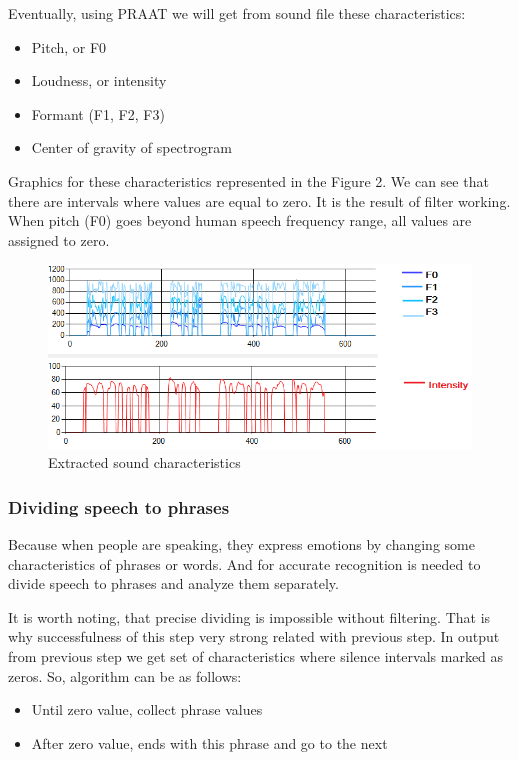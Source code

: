 \documentclass[12pt, letterpaper]{article}
\begin{document}
Eventually, using PRAAT we will get from sound file these characteristics:
\begin{itemize}
	\item Pitch, or F0
	\item Loudness, or intensity
	\item Formant (F1, F2, F3)
	\item Center of gravity of spectrogram
\end{itemize}
Graphics for these characteristics represented in the Figure 2. We can see that there are intervals where values are equal to zero. It is the result of filter working. When pitch (F0) goes beyond human speech frequency range, all values are assigned to zero.
\begin{figure}
	\centering
		\includegraphics[scale=0.8]{images/sound-characteristics.png}
	\caption{Extracted sound characteristics}
	\label{fig:sound-characteristics}
\end{figure}

\subsubsection{Dividing speech to phrases}

Because when people are speaking, they express emotions by changing some characteristics of phrases or words. And for accurate recognition is needed to divide speech to phrases and analyze them separately.

It is worth noting, that precise dividing is impossible without filtering. That is why successfulness of  this step very strong related with previous step. In output from previous step we get set of characteristics where silence intervals marked as zeros. So, algorithm can be as follows: 

 \begin{itemize}
	 \item Until zero value, collect phrase values
		\item After zero value, ends with this phrase and go to the next
 \end{itemize}
\end{document}
